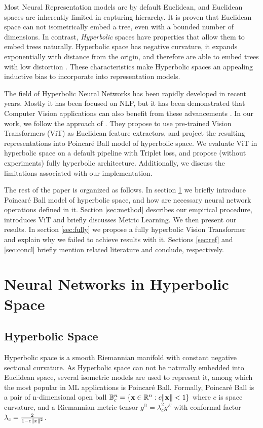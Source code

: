 \documentclass[10pt, letterpaper, twocolumn]{article}
\begin{document}
Most Neural Representation models are by default Euclidean, and Euclidean spaces are inherently limited in capturing hierarchy. It is proven that Euclidean space can not isometrically embed a tree, even with a bounded number of dimensions. In contrast, \emph{Hyperbolic} spaces have properties that allow them to embed trees naturally. Hyperbolic space has negative curvature, it expands exponentially with distance from the origin, and therefore are able to embed trees with low distortion \cite{sarkar_low_2012}. These characteristics make Hyperbolic spaces an appealing inductive bias to incorporate into representation models.

The field of Hyperbolic Neural Networks has been rapidly developed in recent years. Mostly it has been focused on NLP, but it has been demonstrated that Computer Vision applications can also benefit from these advancements \cite{khrulkov_hyperbolic_2020}. In our work, we follow the approach of \cite{ermolov_hyperbolic_2022}. They propose to use pre-trained Vision Transformers (ViT) \cite{dosovitskiy_image_2021} as Euclidean feature extractors, and project the resulting representations into Poincar\'e Ball model of hyperbolic space. We evaluate ViT in hyperbolic space on a default pipeline with Triplet loss, and propose (without experiments) fully hyperbolic architecture. Additionally, we discuss the limitations associated with our implementation.

The rest of the paper is organized as follows. In section \ref{sec:hnn} we briefly introduce Poincar\'e Ball model of hyperbolic space, and how are necessary neural network operations defined in it. Section \ref{sec:method} describes our empirical procedure, introduces ViT and briefly discusses Metric Learning. We then present our results. In section \ref{sec:fully} we propose a fully hyperbolic Vision Transformer and explain why we failed to achieve results with it. Sections \ref{sec:ref} and \ref{sec:concl} briefly mention related literature and conclude, respectively.

\section{Neural Networks in Hyperbolic Space}\label{sec:hnn}

\subsection{Hyperbolic Space}

Hyperbolic space is a smooth Riemannian manifold with constant negative sectional curvature. As Hyperbolic space can not be naturally embedded into Euclidean space, several isometric models are used to represent it, among which the most popular in ML applications is Poincar\'e Ball. Formally, Poincar\'e Ball is a pair of n-dimensional open ball $\mathbb{B}^n_c = \{\mathbf{x} \in \mathbb{R}^n: c \lVert \mathbf{x} \rVert < 1 \}$ where $c$ is space curvature, and a Riemannian metric tensor $g^{\mathbb{D}} = \lambda_c^2 g^E$ with conformal factor $ \lambda_c = \frac{2}{1-c \lVert x \rVert^2}$.
\end{document}

